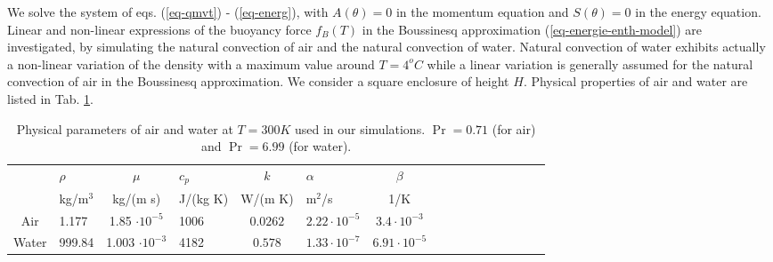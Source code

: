 We solve the system of eqs. (\ref{eq-qmvt}) - (\ref{eq-energ}), with $A(\theta) = 0$ in the momentum equation and $S(\theta) = 0$ in the energy equation.
Linear and non-linear expressions of the buoyancy force $f_B(T)$ in the Boussinesq approximation (\ref{eq-energie-enth-model}) are investigated, by simulating the natural convection of air and the natural convection of water.
Natural convection of water exhibits actually a non-linear variation of the density with a maximum value around $T=4^o C$ while a linear variation is generally assumed for the natural convection of air in the Boussinesq approximation.
We consider a square enclosure of height $H$. 
Physical properties of air and water are listed in Tab. \ref{tab-param-phys-air}.
\begin{table}[ht!]
   \begin{center}
      \begin{tabular}{*{8}{cl}}
         
        & $\rho$ &$ \mu$ & $c_p $ & $k$ & $\alpha $ & $\beta$ \\
        & kg/m$^3$& kg/(m s) & J/(kg K) & W/(m K) & m$^2$/s & 1/K \\
         \hline
        Air & 1.177 & 1.85 $\cdot 10^{-5}$  & 1006 & $0.0262$ & $2.22 \cdot 10^{-5}$ & $3.4 \cdot 10^{-3}$ \\
        Water & 999.84 & 1.003 $\cdot 10^{-3}$  & 4182 & $0.578$ & $1.33 \cdot 10^{-7}$ & $6.91 \cdot 10^{-5}$
      \end{tabular}
   \end{center}
   \caption{Physical parameters of air and water at $T = 300K$ used in our simulations. $\Pr = 0.71$ (for air) and $\Pr = 6.99$ (for water).}
   \label{tab-param-phys-air}
\end{table}


